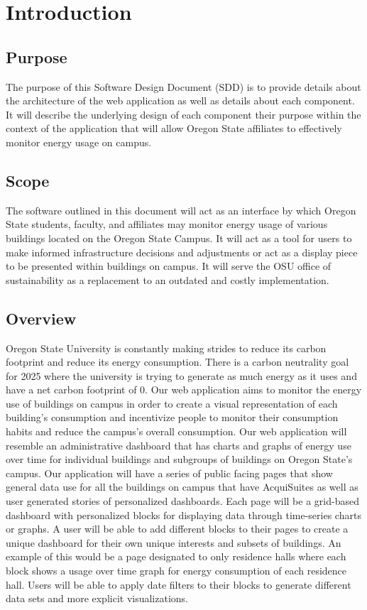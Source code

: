 \documentclass[journal,10pt,onecolumn,compsoc]{IEEEtran}
\begin{document}
    \section{Introduction}
    \subsection{Purpose}
	
    The purpose of this Software Design Document (SDD) is to provide details about the architecture of the web application as well
	as details about each component. It will describe the underlying design of each component their purpose within the context
	of the application that will allow Oregon State affiliates to effectively monitor energy usage on campus.
	
    \subsection{Scope}
    
	The software outlined in this document will act as an interface by which Oregon State students, faculty, and affiliates
	may monitor energy usage of various buildings located on the Oregon State Campus. It will act as a tool for users to 
	make informed infrastructure decisions and adjustments or act as a display piece to be presented within buildings on campus.
	It will serve the OSU office of sustainability as a replacement to an outdated and costly implementation. 
	
    \subsection{Overview}
    Oregon State University is constantly making strides to reduce its carbon footprint and reduce its energy consumption. There is a carbon neutrality goal for 2025 where the university is trying to generate as much energy as it uses and have a net carbon footprint of 0. Our web application aims to monitor the energy use of buildings on campus in order to create a visual representation of each building's consumption and incentivize people to monitor their consumption habits and reduce the campus's overall consumption.
    \noindent Our web application will resemble an administrative dashboard that has charts and graphs of energy use over time for individual buildings and subgroups of buildings on Oregon State's campus. 
    Our application will have a series of public facing pages that show general data use for all the buildings on campus that have AcquiSuites as well as user generated stories of personalized dashboards. Each page will be a grid-based dashboard with personalized blocks for displaying data through time-series charts or graphs. A user will be able to add different blocks to their pages to create a unique dashboard for their own unique interests and subsets of buildings. An example of this would be a page designated to only residence halls where each block shows a usage over time graph for energy consumption of each residence hall. Users will be able to apply date filters to their blocks to generate different data sets and more explicit visualizations.
\end{document}
